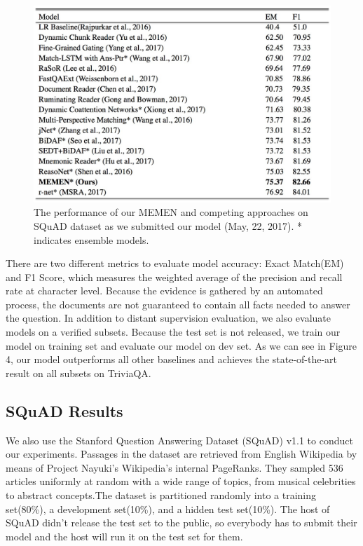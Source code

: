 \documentclass[letterpaper]{article}
\begin{document}
  \begin{figure}[htbp]
  \begin{center}
  \includegraphics[width=0.7 \textwidth]{performance_squad.jpg}
  \caption{The performance of our MEMEN and competing approaches on SQuAD dataset as we submitted our model (May, 22, 2017). * indicates ensemble models.}
  \end{center}
\end{figure}

There are two different metrics to evaluate model accuracy: Exact Match(EM) and F1 Score, which measures the weighted average of the precision and recall rate at character level. Because the evidence is gathered by an automated process, the documents are not guaranteed to contain all facts needed to answer the question. In addition to distant supervision evaluation, we also evaluate models on a verified subsets. Because the test set is not released, we train our model on training set and evaluate our model on dev set. As we can see in Figure 4, our model outperforms all other baselines and achieves the state-of-the-art result on all subsets on TriviaQA.


\subsection{SQuAD Results}
We also use the Stanford Question Answering Dataset (SQuAD) v1.1 to conduct our experiments. Passages in the dataset are retrieved from English Wikipedia by means of Project Nayuki's Wikipedia's internal PageRanks. They sampled 536 articles uniformly at random with a wide range of topics, from musical celebrities to abstract concepts.The dataset is partitioned randomly into a training set(80\%), a development set(10\%), and a hidden test set(10\%). The host of SQuAD didn't release the test set to the public, so everybody has to submit their model and the host will run it on the test set for them. 
\end{document}
